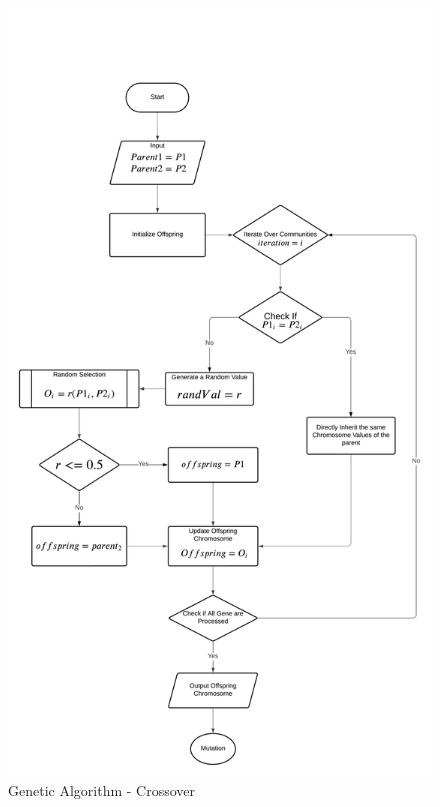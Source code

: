 \begin{appendices}
\begin{centerappendixtitle}
		\begin{figure}[h]
			\centering
			\caption{Genetic Algorithm - Crossover}
			\label{crossFlow}
			\includegraphics[width=\linewidth]{appendix/crossover f}
		\end{figure}
		

\end{centerappendixtitle}
\end{appendices}
